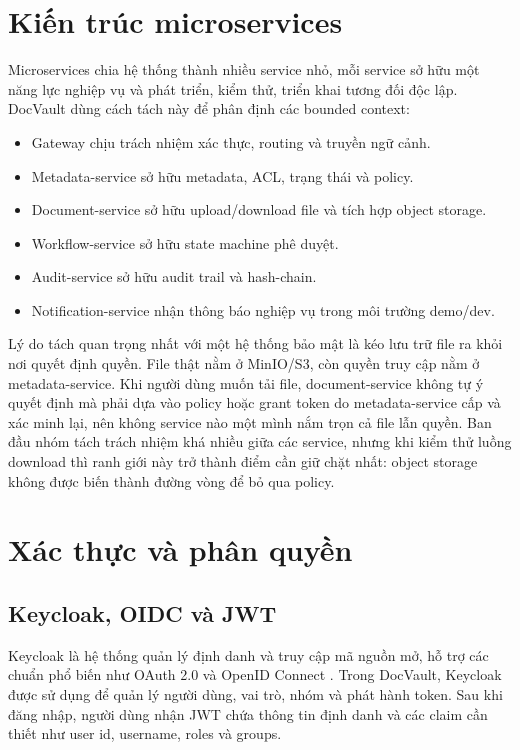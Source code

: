 \section{Kiến trúc microservices}

Microservices chia hệ thống thành nhiều service nhỏ, mỗi service sở hữu một năng lực nghiệp vụ và phát triển, kiểm thử, triển khai tương đối độc lập. DocVault dùng cách tách này để phân định các bounded context:

\begin{itemize}
  \item Gateway chịu trách nhiệm xác thực, routing và truyền ngữ cảnh.
  \item Metadata-service sở hữu metadata, ACL, trạng thái và policy.
  \item Document-service sở hữu upload/download file và tích hợp object storage.
  \item Workflow-service sở hữu state machine phê duyệt.
  \item Audit-service sở hữu audit trail và hash-chain.
  \item Notification-service nhận thông báo nghiệp vụ trong môi trường demo/dev.
\end{itemize}

Lý do tách quan trọng nhất với một hệ thống bảo mật là kéo lưu trữ file ra khỏi nơi quyết định quyền. File thật nằm ở MinIO/S3, còn quyền truy cập nằm ở metadata-service. Khi người dùng muốn tải file, document-service không tự ý quyết định mà phải dựa vào policy hoặc grant token do metadata-service cấp và xác minh lại, nên không service nào một mình nắm trọn cả file lẫn quyền. Ban đầu nhóm tách trách nhiệm khá nhiều giữa các service, nhưng khi kiểm thử luồng download thì ranh giới này trở thành điểm cần giữ chặt nhất: object storage không được biến thành đường vòng để bỏ qua policy.

\section{Xác thực và phân quyền}

\subsection{Keycloak, OIDC và JWT}

Keycloak là hệ thống quản lý định danh và truy cập mã nguồn mở, hỗ trợ các chuẩn phổ biến như OAuth 2.0 và OpenID Connect \cite{keycloak_docs}. Trong DocVault, Keycloak được sử dụng để quản lý người dùng, vai trò, nhóm và phát hành token. Sau khi đăng nhập, người dùng nhận JWT chứa thông tin định danh và các claim cần thiết như user id, username, roles và groups.

